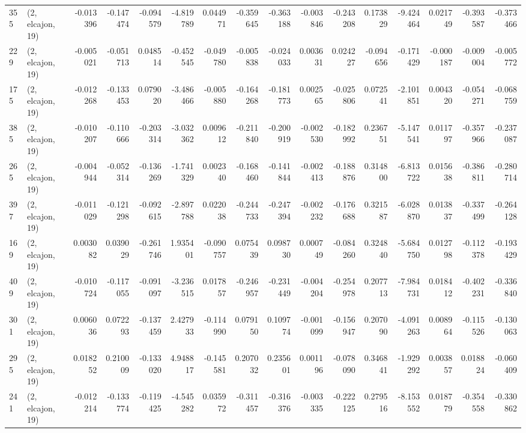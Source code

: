 \begin{tabular}{llrrrrrrrrrrrrrr}
355 &  (2, elcajon, 19) &  -0.013396 & -0.147474 & -0.094579 &  -4.819789 &  0.044971 &  -0.359645 & -0.363188 & -0.003846 & -0.243208 &  0.173829 &    -9.424464 &   0.021749 &  -0.393587 &  -0.373466 \\
229 &  (2, elcajon, 19) &  -0.005021 & -0.051713 &  0.048514 &  -0.452545 & -0.049780 &  -0.005838 & -0.024033 &  0.003631 &  0.024227 & -0.094656 &    -0.171429 &  -0.000187 &  -0.009004 &  -0.005772 \\
175 &  (2, elcajon, 19) &  -0.012268 & -0.133453 &  0.079020 &  -3.486466 & -0.005880 &  -0.164268 & -0.181773 &  0.002565 & -0.025806 &  0.072541 &    -2.101851 &   0.004320 &  -0.054271 &  -0.068759 \\
385 &  (2, elcajon, 19) &  -0.010207 & -0.110666 & -0.203314 &  -3.032362 &  0.009612 &  -0.211840 & -0.200919 & -0.002530 & -0.182992 &  0.236751 &    -5.147541 &   0.011797 &  -0.357966 &  -0.237087 \\
265 &  (2, elcajon, 19) &  -0.004944 & -0.052314 & -0.136269 &  -1.741329 &  0.002340 &  -0.168460 & -0.141844 & -0.002413 & -0.188876 &  0.314800 &    -6.813722 &   0.015638 &  -0.386811 &  -0.280714 \\
397 &  (2, elcajon, 19) &  -0.011029 & -0.121298 & -0.092615 &  -2.897788 &  0.022038 &  -0.244733 & -0.247394 & -0.002232 & -0.176688 &  0.321587 &    -6.028870 &   0.013837 &  -0.337499 &  -0.264128 \\
169 &  (2, elcajon, 19) &   0.003082 &  0.039029 & -0.261746 &   1.935401 & -0.090757 &   0.075439 &  0.098730 &  0.000749 & -0.084260 &  0.324840 &    -5.684750 &   0.012798 &  -0.112378 &  -0.193429 \\
409 &  (2, elcajon, 19) &  -0.010724 & -0.117055 & -0.091097 &  -3.236515 &  0.017857 &  -0.246957 & -0.231449 & -0.004204 & -0.254978 &  0.207713 &    -7.984731 &   0.018412 &  -0.402231 &  -0.336840 \\
301 &  (2, elcajon, 19) &   0.006036 &  0.072293 & -0.137459 &   2.427933 & -0.114990 &   0.079150 &  0.109774 & -0.001099 & -0.156947 &  0.207090 &    -4.091263 &   0.008964 &  -0.115526 &  -0.130063 \\
295 &  (2, elcajon, 19) &   0.018252 &  0.210009 & -0.133020 &   4.948817 & -0.145581 &   0.207032 &  0.235601 &  0.001196 & -0.078090 &  0.346841 &    -1.929292 &   0.003857 &   0.018824 &  -0.060409 \\
241 &  (2, elcajon, 19) &  -0.012214 & -0.133774 & -0.119425 &  -4.545282 &  0.035972 &  -0.311457 & -0.316376 & -0.003335 & -0.222125 &  0.279516 &    -8.153552 &   0.018779 &  -0.354558 &  -0.330862 \\

\end{tabular}
